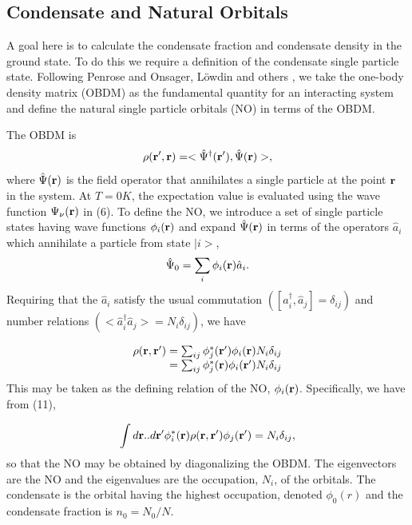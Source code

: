 \documentclass[aps,pra,twocolumn,groupedaddress]{revtex4}
\begin{document}
\subsection{Condensate and Natural Orbitals}
A goal here is to calculate the condensate fraction and condensate density
in the ground state.  To do this we require a definition of the condensate
single particle state.  Following Penrose and Onsager, L\"owdin and others
\cite{onsager56,lowdin55}, we take the one-body density matrix (OBDM)
as the fundamental quantity for an interacting system and define the 
natural single particle orbitals (NO) in terms of the OBDM.

The OBDM is \cite{baym76}
\begin{equation}
\rho({\bf r'},{\bf r}) = <\hat{\Psi}^{\dagger}({\bf r}'),\hat{\Psi}({\bf r})>,
\end{equation}
where $\hat{\Psi}({\bf r})$ is the field operator that annihilates 
a single particle
at the point ${\bf r}$ in the system.  At $T=0K$, the expectation value is
evaluated using the wave function  $\Psi_\nu({\bf r})$ in (6).
To define the NO, we introduce a set of single particle states having wave
functions $\phi_i({\bf r})$ and expand $\hat{\Psi}({\bf r})$ in terms of the 
operators $\hat{a}_i$ which annihilate a particle from state $|i>$,
\begin{equation}
\hat{\Psi}_0 =\sum_i\phi_i({\bf r})\hat{a}_i.
\end{equation}
Requiring that the $\hat{a}_i$ satisfy the usual commutation 
$([\hat{a}_i^{\dagger},\hat{a}_j] = \delta_{ij})$ and number relations
$(<\hat{a}_i^{\dagger}\hat{a}_j>=N_i\delta_{ij})$, we have

\begin{equation}
\begin{array}{r}
\rho({\bf r},{\bf r}') =
        \sum_{ij}\phi_j^{*}({\bf r}')\phi_i({\bf r})N_i\delta_{ij}\\
        =\sum_{ij}\phi_j^{*}({\bf r})\phi_i({\bf r}')N_i\delta_{ij}
\end{array}
\end{equation}
This may be taken as the defining relation of the NO, $\phi_i({\bf r})$.
Specifically, we have from (11),

\begin{equation}
        \int{
                d{\bf r}..d{\bf r}'
		\phi_i^{*}({\bf r})
		\rho({\bf r},{\bf r}')
		\phi_j({\bf r}')
		= N_i\delta_{ij}
        },
\end{equation}
so that the NO may be obtained by diagonalizing the OBDM.  The eigenvectors
are the NO and the eigenvalues are the occupation, $N_i$, of the orbitals.  The 
condensate is the orbital having the highest occupation, denoted $\phi_0(r)$
and the condensate fraction is $n_0=N_0/N$.
\end{document}
